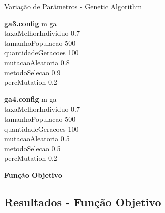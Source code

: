 \documentclass[compress, hide notes]{beamer}
\begin{document}
				\begin{frame}[fragile]{Variação de Parâmetros - Genetic Algorithm}
					\begin{minipage}{5cm}
                    
						\begin{block}{\textbf{ga3.config}}
                              m ga\\
                              taxaMelhorIndividuo 0.7\\
                              tamanhoPopulacao 500\\
                              quantidadeGeracoes 100\\
                              mutacaoAleatoria 0.8\\
                              metodoSelecao 0.9\\
                              percMutation 0.2
						\end{block}
					\end{minipage}\hfill
					\begin{minipage}{5cm}
                    
						\begin{block}{\textbf{ga4.config}}
                              m ga\\
                              taxaMelhorIndividuo 0.7\\
                              tamanhoPopulacao 500\\
                              quantidadeGeracoes 100\\
                              mutacaoAleatoria 0.5\\
                              metodoSelecao 0.5\\
                              percMutation 0.2
						\end{block}
					\end{minipage}
				\end{frame}
                
                
             
	\begin{frame}{}
		\centering
		\Huge \color{blue} \textbf{Função Objetivo}
	\end{frame}   
    
                
	\subsection{Resultados - Função Objetivo}
    
\end{document}
